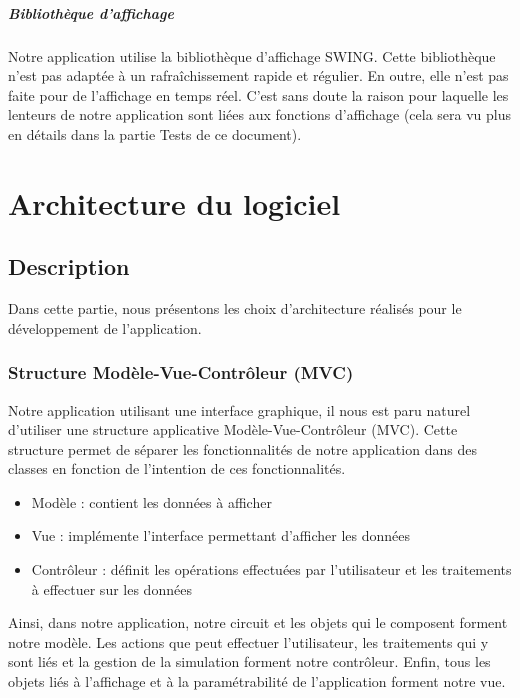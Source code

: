 \documentclass{report}
\begin{document}
\paragraph{Bibliothèque d'affichage}

Notre application utilise la bibliothèque d’affichage SWING. Cette bibliothèque n’est pas adaptée à un rafraîchissement rapide et régulier. En outre, elle n’est pas faite pour de l’affichage en temps réel. C’est sans doute la raison pour laquelle les lenteurs de notre application sont liées aux fonctions d’affichage (cela sera vu plus en détails dans la partie Tests de ce document).

\chapter{Architecture du logiciel}

\section{Description}

Dans cette partie, nous présentons les choix d'architecture réalisés pour le développement de l'application.

\subsection{Structure Modèle-Vue-Contrôleur (MVC)}

Notre application utilisant une interface graphique, il nous est paru naturel d'utiliser une structure applicative Modèle-Vue-Contrôleur (MVC). Cette structure permet de séparer les fonctionnalités de notre application dans des classes en fonction de l'intention de ces fonctionnalités. 
\begin{itemize}
\item Modèle : contient les données à afficher
\item Vue : implémente l'interface permettant d'afficher les données
\item Contrôleur : définit les opérations effectuées par l'utilisateur et les traitements à effectuer sur les données
\end{itemize}

Ainsi, dans notre application, notre circuit et les objets qui le composent forment notre modèle. Les actions que peut effectuer l'utilisateur, les traitements qui y sont liés et la gestion de la simulation forment notre contrôleur. Enfin, tous les objets liés à l'affichage et à la paramétrabilité de l'application forment notre vue.
\end{document}
